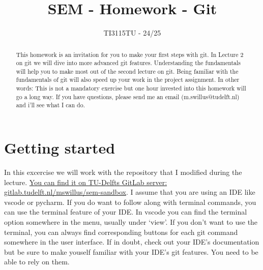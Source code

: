 \documentclass[12pt]{article}
\title{SEM - Homework - Git}
\date{TI3115TU - 24/25}
\begin{document}
\markboth{}{\thetitle}

\maketitle


\begin{abstract}
    This homework is an invitation for you to make your first
    steps with git.
    In Lecture 2 on git we will dive into more advanced git features.
    Understanding the fundamentals
    will help you
    to make most out of the second lecture on git.
    Being familiar with the fundamentals of git
    will also speed up your work in the project assignment.
    In other words:
    This is not a mandatory exercise but one hour invested
    into this homework will go a long way.
    If you have questions,
    please send me an email (m.swillus@tudelft.nl)
    and i'll see what I can do.
\end{abstract}

\section{Getting started}
In this excercise we will work with
the repository that I modified during the lecture.
\href{https://gitlab.tudelft.nl/mswillus/sem-sandbox/}{
You can find it on TU-Delfts GitLab server: gitlab.tudelft.nl/mswillus/sem-sandbox}.
I assume that you are using an IDE like vscode or pycharm.
If you do want to follow along with terminal commands,
you can use the terminal feature of your IDE.
In vscode you can find the terminal option somewhere in the menu, usually under `view'.
If you don't want to use the terminal,
you can always find corresponding buttons for each git command somewhere in the user interface.
If in doubt, check out your IDE's documentation
but be sure to make youself familiar with your IDE's git features.
You need to be able to rely on them.
\end{document}

